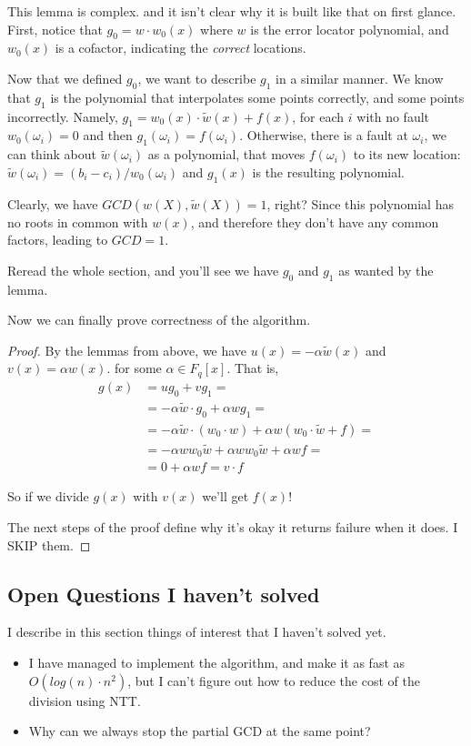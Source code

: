 This lemma is complex. and it isn't clear why it is built like that on first glance. 
First, notice that $g_0=w\cdot w_0(x)$ where $w$ is the error locator polynomial,
and $w_0(x)$ is a cofactor, indicating the \emph{correct} locations.

Now that we defined $g_0$, we want to describe $g_1$ 
in a similar manner. We know that $g_1$ is the polynomial that interpolates
some points correctly, and some points incorrectly.
Namely, $g_1=w_0(x)\cdot \tilde{w}(x)+f(x)$, for each $i$ with no fault $w_0(\omega_i)=0$
and then $g_1(\omega_i)=f(\omega_i)$. Otherwise, there is a fault at $\omega_i$, 
we can think about $\tilde{w}(\omega_i)$ as a polynomial,
that moves $f(\omega_i)$ to its new location:
$\tilde{w}(\omega_i)=(b_i-c_i)/w_0(\omega_i)$ and $g_1(x)$ is the resulting polynomial.

Clearly, we have $GCD(w(X),\tilde{w}(X))=1$, right? 
Since this polynomial has no roots in common with 
$w(x)$, and therefore they don't have any common
 factors, leading to $GCD=1$.

Reread the whole section, and you'll see we have $g_0$ and $g_1$ as wanted by the lemma.

Now we can finally prove correctness of the algorithm.
\begin{proof}
By the lemmas from above, we have 
$u(x)=-\alpha\tilde{w}(x)$ and $v(x)=\alpha w(x)$. for some $\alpha\in F_q[x]$.
That is, 
\begin{equation}
    \begin{split}
    g(x) & = u g_0+vg_1= \\
         & = -\alpha\tilde{w}\cdot g_0 + \alpha w g_1= \\
         & = -\alpha\tilde{w}\cdot (w_0 \cdot w) + \alpha w (w_0 \cdot \tilde{w}+f) = \\
         & = -\alpha w w_0 \tilde{w} + \alpha w w_0 \tilde{w} + \alpha w f = \\
         & = 0 + \alpha w f = v\cdot f
    \end{split}
\end{equation}

So if we divide $g(x)$ with $v(x)$ we'll get $f(x)$!

The next steps of the proof define why it's okay it returns failure when it does.
I SKIP them.
\end{proof}

\subsection{Open Questions I haven't solved}
I describe in this section things of interest that I haven't solved yet.
\begin{itemize}
    \item I have managed to implement the algorithm, and make it as fast as $O(log(n)\cdot n^2)$, 
    but I can't figure out how to reduce the cost of the division using NTT.

    \item Why can we always stop the partial GCD at the same point?
\end{itemize}

